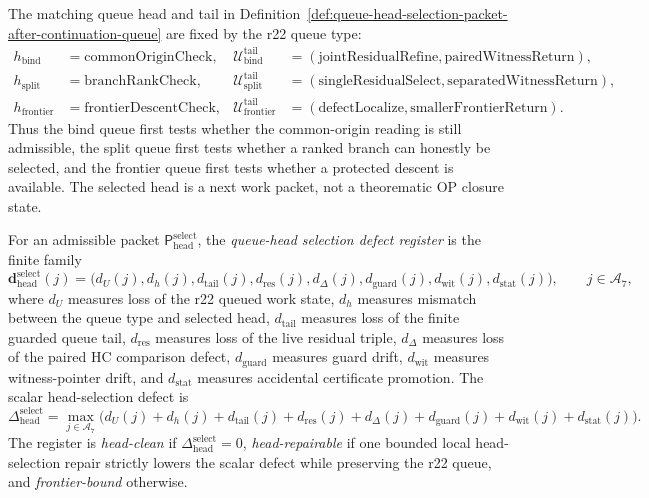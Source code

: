 \begin{definition}
\label{def:continuation-queue-heads-and-finite-tails}
The matching queue head and tail in Definition~\ref{def:queue-head-selection-packet-after-continuation-queue} are fixed by the r22 queue type:
\[
\begin{aligned}
  h_{\mathrm{bind}}
  &= \mathrm{commonOriginCheck},
  &\mathcal U_{\mathrm{bind}}^{\mathrm{tail}}
  &= (\mathrm{jointResidualRefine},\mathrm{pairedWitnessReturn}),\\
  h_{\mathrm{split}}
  &= \mathrm{branchRankCheck},
  &\mathcal U_{\mathrm{split}}^{\mathrm{tail}}
  &= (\mathrm{singleResidualSelect},\mathrm{separatedWitnessReturn}),\\
  h_{\mathrm{frontier}}
  &= \mathrm{frontierDescentCheck},
  &\mathcal U_{\mathrm{frontier}}^{\mathrm{tail}}
  &= (\mathrm{defectLocalize},\mathrm{smallerFrontierReturn}).
\end{aligned}
\]
Thus the bind queue first tests whether the common-origin reading is still admissible, the split queue first tests whether a ranked branch can honestly be selected, and the frontier queue first tests whether a protected descent is available.  The selected head is a next work packet, not a theorematic OP closure state.
\end{definition}

\begin{definition}
\label{def:queue-head-selection-defect-register}
For an admissible packet \(\mathsf P_{\mathrm{head}}^{\mathrm{select}}\), the \emph{queue-head selection defect register} is the finite family
\[
  \mathbf d_{\mathrm{head}}^{\mathrm{select}}(j)
  =
  \bigl(d_U(j),d_h(j),d_{\mathrm{tail}}(j),d_{\mathrm{res}}(j),
        d_{\Delta}(j),d_{\mathrm{guard}}(j),d_{\mathrm{wit}}(j),d_{\mathrm{stat}}(j)\bigr),
  \qquad j\in\mathcal A_7,
\]
where \(d_U\) measures loss of the r22 queued work state, \(d_h\) measures mismatch between the queue type and selected head, \(d_{\mathrm{tail}}\) measures loss of the finite guarded queue tail, \(d_{\mathrm{res}}\) measures loss of the live residual triple, \(d_{\Delta}\) measures loss of the paired HC comparison defect, \(d_{\mathrm{guard}}\) measures guard drift, \(d_{\mathrm{wit}}\) measures witness-pointer drift, and \(d_{\mathrm{stat}}\) measures accidental certificate promotion.  The scalar head-selection defect is
\[
  \Delta_{\mathrm{head}}^{\mathrm{select}}
  =
  \max_{j\in\mathcal A_7}
  \bigl(d_U(j)+d_h(j)+d_{\mathrm{tail}}(j)+d_{\mathrm{res}}(j)+d_{\Delta}(j)
        +d_{\mathrm{guard}}(j)+d_{\mathrm{wit}}(j)+d_{\mathrm{stat}}(j)\bigr).
\]
The register is \emph{head-clean} if \(\Delta_{\mathrm{head}}^{\mathrm{select}}=0\), \emph{head-repairable} if one bounded local head-selection repair strictly lowers the scalar defect while preserving the r22 queue, and \emph{frontier-bound} otherwise.
\end{definition}

